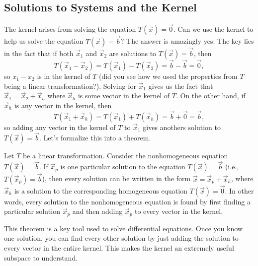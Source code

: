 \subsection{Solutions to Systems and the Kernel}

The kernel arises from solving the equation $T(\vec x)=\vec 0$.  Can we use the kernel to help us solve the equation $T(\vec x)=\vec b$?  The answer is amazingly yes. The key lies in the fact that if both $\vec x_1$ and $\vec x_2$ are solutions to $T(\vec x)=\vec b$, then $$T(\vec x_1-\vec x_2)=T(\vec x_1)-T(\vec x_2)=\vec b - \vec b=\vec 0,$$
so $x_1-x_2$ is in the kernel of $T$ (did you see how we used the properties from $T$ being a linear transformation?).  Solving for $\vec x_1$ gives us the fact that $\vec x_1=\vec x_2+\vec x_h$ where $\vec x_h$ is some vector in the kernel of $T$. On the other hand, if $\vec x_h$ is any vector in the kernel, then $$T(\vec x_1+\vec x_h)=T(\vec x_1)+T(\vec x_h)=\vec b + \vec 0=\vec b,$$
so adding any vector in the kernel of $T$ to $\vec x_1$ gives anothers solution to $T(\vec x)=\vec b$.  Let's formalize this into a theorem.
\begin{theorem}
Let $T$ be a linear transformation. Consider the nonhomogeneous equation $T(\vec x)=\vec b$.
If $\vec x_p$ is one particular solution to the equation $T(\vec x)=\vec b$ (i.e., $T(\vec x_p)=\vec b$), then every solution can be written in the form $\vec x = \vec x_p+\vec x_h$, where $\vec x_h$ is a solution to the corresponding homogeneous equation $T(\vec x)=\vec 0$.  In other words, every solution to the nonhomogeneous equation is found by first finding a particular solution $\vec x_p$ and then adding $\vec x_p$ to every vector in the kernel.  
\end{theorem} 
This theorem is a key tool used to solve differential equations.  Once you know one solution, you can find every other solution by just adding the solution to every vector in the entire kernel. This makes the kernel an extremely useful subspace to understand.

